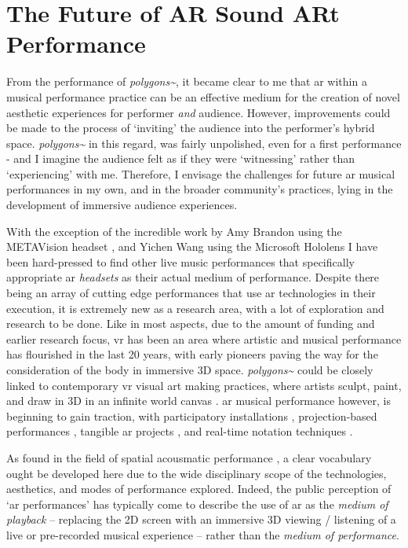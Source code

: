 \section{The Future of AR Sound ARt Performance}
From the performance of \textit{polygons\textasciitilde{}}, it became clear to me that \gls{ar} within a musical performance practice can be an effective medium for the creation of novel aesthetic experiences for performer \textit{and} audience. However, improvements could be made to the process of `inviting' the audience into the performer's hybrid space. \textit{polygons\textasciitilde{}} in this regard, was fairly unpolished, even for a first performance - and I imagine the audience felt as if they were `witnessing' rather than `experiencing' with me. Therefore, I envisage the challenges for future \gls{ar} musical performances in my own, and in the broader community's practices, lying in the development of immersive audience experiences.

With the exception of the incredible work by Amy Brandon using the METAVision headset \citeyearpar{brandon2018}, and Yichen Wang using the Microsoft Hololens \citeyearpar{wang2022} I have been hard-pressed to find other live music performances that specifically appropriate \gls{ar} \textit{headsets} as their actual medium of performance. Despite there being an array of cutting edge performances that use \gls{ar} technologies in their execution, it is extremely new as a research area, with a lot of exploration and research to be done. Like in most aspects, due to the amount of funding and earlier research focus, \gls{vr} has been an area where artistic and musical performance has flourished in the last 20 years, with early pioneers \citep{davies2004} paving the way for the consideration of the body in immersive 3D space. \textit{polygons\textasciitilde{}} could be closely linked to contemporary \gls{vr} visual art making practices, where artists sculpt, paint, and draw in 3D in an infinite world canvas \citep{summers2019}. \gls{ar} musical performance however, is beginning to gain traction, with participatory installations \citep{chevalier2018},  projection-based performances \citep{quay2016,berthaut2016,robinson2020,larrieux2022}, tangible \gls{ar} projects \citep{zamborlin2018}, and real-time notation techniques \citep{santini2020,santini2022}. 

As found in the field of spatial acousmatic performance \citep{sharma2015}, a clear vocabulary ought be developed here due to the wide disciplinary scope of the technologies, aesthetics, and modes of performance explored. Indeed, the public perception of `\gls{ar} performances' has typically come to describe the use of \gls{ar} as the \textit{medium of playback} -- replacing the 2D screen with an immersive 3D viewing / listening of a live or pre-recorded musical experience -- rather than the \textit{medium of performance}.

